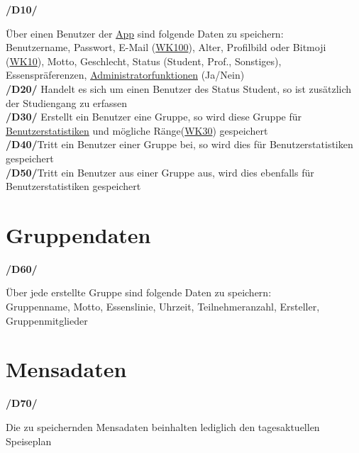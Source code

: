 \documentclass[a4paper]{scrreprt}
\begin{document}
\begin{addmargin}[25pt]{0pt}
\hypertarget{d10}{\textbf{/D10/}} Über einen Benutzer der \hyperlink{label6}{App} sind folgende Daten zu speichern:\\
Benutzername, Passwort, E-Mail (\hyperlink{wk100}{WK100}), Alter, Profilbild oder Bitmoji (\hyperlink{wk10}{WK10}), Motto, Geschlecht, Status (Student, Prof., Sonstiges), Essenspräferenzen, \hyperlink{label8}{Administratorfunktionen} (Ja/Nein)\\
\hypertarget{d20}{\textbf{/D20/}} Handelt es sich um einen Benutzer des Status Student, so ist zusätzlich der Studiengang zu erfassen\\
\hypertarget{d30}{\textbf{/D30/}} Erstellt ein Benutzer eine Gruppe, so wird diese Gruppe für \hyperlink{label9}{Benutzerstatistiken} und mögliche Ränge(\hyperlink{wk30}{WK30}) gespeichert\\
\hypertarget{d40}{\textbf{/D40/}}Tritt ein Benutzer einer Gruppe bei, so wird dies für Benutzerstatistiken gespeichert\\
\hypertarget{d50}{\textbf{/D50/}}Tritt ein Benutzer aus einer Gruppe aus, wird dies ebenfalls für Benutzerstatistiken gespeichert\\


\end{addmargin}

\section{Gruppendaten}

\begin{addmargin}[25pt]{0pt}
\hypertarget{d60}{\textbf{/D60/}} Über jede erstellte Gruppe sind folgende Daten zu speichern:\\
Gruppenname, Motto, Essenslinie, Uhrzeit, Teilnehmeranzahl, Ersteller, Gruppenmitglieder\\
\end{addmargin}

\section{Mensadaten}

\begin{addmargin}[25pt]{0pt}
\hypertarget{d70}{\textbf{/D70/}} Die zu speichernden Mensadaten beinhalten lediglich den tagesaktuellen Speiseplan\\
\end{addmargin}
\end{document}
